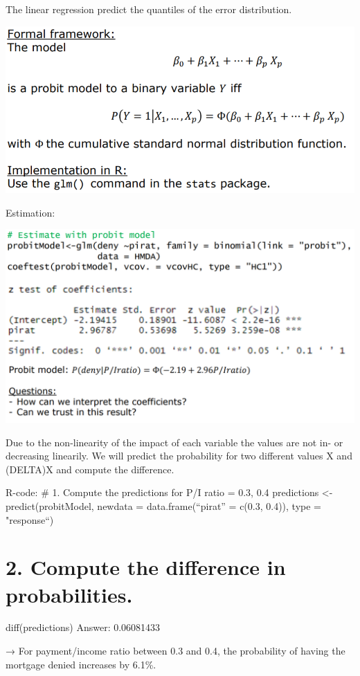 \documentclass[
]{article}
\begin{document}
The linear regression predict the quantiles of the error distribution.

\includegraphics[width=1\linewidth]{glm}

Estimation:

\includegraphics[width=1\linewidth]{esti}

Due to the non-linearity of the impact of each variable the values are
not in- or decreasing linearily. We will predict the probability for two
different values X and (DELTA)X and compute the difference.

R-code: \# 1. Compute the predictions for P/I ratio = 0.3, 0.4
predictions \textless- predict(probitModel, newdata =
data.frame(``pirat'' = c(0.3, 0.4)), type = "response``)

\hypertarget{compute-the-difference-in-probabilities.}{%
\section{2. Compute the difference in
probabilities.}\label{compute-the-difference-in-probabilities.}}

diff(predictions) Answer: 0.06081433

→ For payment/income ratio between 0.3 and 0.4, the probability of
having the mortgage denied increases by 6.1\%.
\end{document}

